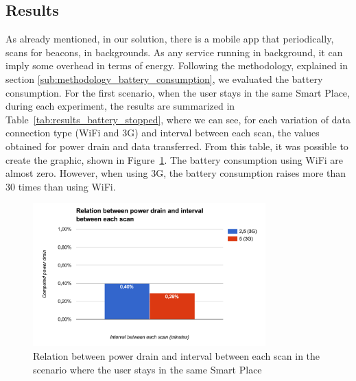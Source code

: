 \subsection{Results}
\label{sub:evaluation_energy_consumption_results}
As already mentioned, in our solution, there is a mobile app that periodically, scans for beacons, in backgrounds.
As any service running in background, it can imply some overhead in terms of energy.
Following the methodology, explained in section \ref{sub:methodology_battery_consumption}, we evaluated the battery consumption.
For the first scenario, when the user stays in the same Smart Place, during each experiment, the results are summarized in Table~\ref{tab:results_battery_stopped}, where we can see, for each variation of data connection type (\gls{WiFi} and \gls{3G}) and interval between each scan, the values obtained for power drain and data transferred.
From this table, it was possible to create the graphic, shown in Figure~\ref{fig:results_battery_stopped}.
The battery consumption using \gls{WiFi} are almost zero.
However, when using \gls{3G}, the battery consumption raises more than 30 times than using \gls{WiFi}.



\begin{figure}[!ht]
  \centering
    \includegraphics[width=0.8\textwidth, keepaspectratio]{images/results_battery_stopped}
    \caption[Power drain when the user does not move]{Relation between power drain and interval between each scan in the scenario where the user stays in the same Smart Place}
    \label{fig:results_battery_stopped}
\end{figure}

